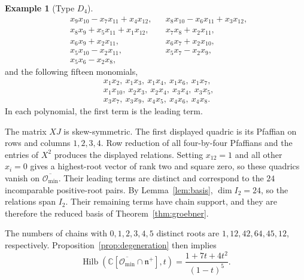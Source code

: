 \documentclass[12pt]{article}
\theoremstyle{definition}
\newtheorem{example}[theorem]{Example}
\DeclareMathOperator{\Hilb}{Hilb}
\newcommand{\C}{\mathbb C}
\newcommand{\n}{\mathfrak n^{+}}
\newcommand{\oc}{\overline{\mathcal O_{\min}}}
\begin{document}
\begin{example}[Type $D_4$]
\begin{align*}
        &x_9x_{10}-x_7x_{11}+x_4x_{12},
        &&x_8x_{10}-x_6x_{11}+x_3x_{12},\\
        &x_8x_9+x_5x_{11}+x_1x_{12},
        &&x_7x_8+x_2x_{11},\\
        &x_6x_9+x_2x_{11},
        &&x_6x_7+x_2x_{10},\\
        &x_5x_{10}-x_2x_{11},
        &&x_5x_7-x_2x_9,\\
        &x_5x_6-x_2x_8,
    \end{align*}
    and the following fifteen monomials,
    \begin{align*}
        &x_1x_2,\ x_1x_3,\ x_1x_4,\ x_1x_6,\ x_1x_7,\\
        &x_1x_{10},\ x_2x_3,\ x_2x_4,\ x_3x_4,\ x_3x_5,\\
        &x_3x_7,\ x_3x_9,\ x_4x_5,\ x_4x_6,\ x_4x_8.
    \end{align*}
    In each polynomial, the first term is the leading term.

    The matrix $XJ$ is skew-symmetric. The first displayed quadric is its Pfaffian on rows and columns $1,2,3,4$. Row reduction of all four-by-four Pfaffians and the entries of $X^2$ produces the displayed relations. Setting $x_{12}=1$ and all other $x_i=0$ gives a highest-root vector of rank two and square zero, so these quadrics vanish on $\oc$. Their leading terms are distinct and correspond to the $24$ incomparable positive-root pairs. By Lemma~\ref{lem:basis}, $\dim I_2=24$, so the relations span $I_2$. Their remaining terms have chain support, and they are therefore the reduced basis of Theorem~\ref{thm:groebner}.

    The numbers of chains with $0,1,2,3,4,5$ distinct roots are $1,12,42,64,45,12$, respectively. Proposition~\ref{prop:degeneration} then implies
    $$
        \Hilb(\C[\oc\cap\n],t)=\frac{1+7t+4t^2}{(1-t)^5}.
    $$
\end{example}
\end{document}
